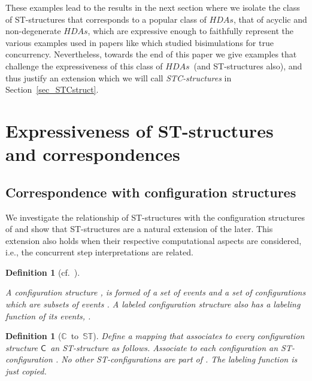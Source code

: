 \documentclass[submission,copyright,creativecommons]{eptcs}
\newtheorem{definition}[theorem]{Definition}
\newcommand\HDAs{\ensuremath{\mathit{HDAs}}}
\newcommand\C{\ensuremath{\mathsf{C}}}
\newcommand\allC{\ensuremath{\mathbb{C}}}
\newcommand\allST{\ensuremath{\mathbb{ST}}}
\begin{document}
These examples lead to the results in the next section where we isolate the class of ST-structures that corresponds to a popular class of \HDAs, that of acyclic and non-degenerate \HDAs, which are expressive enough to faithfully represent the various examples used in papers like \cite{GlabbeekV97splitting,GlabbeekG01refinement,BaldanC10concur,phillips11express} which studied bisimulations for true concurrency. Nevertheless, towards the end of this paper we give examples that challenge the expressiveness of this class of \HDAs\ (and ST-structures also), and thus justify an extension which we will call \textit{STC-structures} in Section~\ref{sec_STCstruct}. 



\section{Expressiveness of ST-structures and correspondences}\label{subsec_expressST}



\subsection{Correspondence with configuration structures}\label{subsec_configStruct}

We investigate the relationship of ST-structures with the configuration structures of \cite{GlabbeekP95config,GlabbeekP09configStruct} and show that ST-structures are a natural extension of the later. This extension also holds when their respective computational aspects are considered, i.e., the concurrent step interpretations are related.

\begin{definition}[{cf.~\cite[Def.5.1]{GlabbeekG01refinement}\cite[Def.1.1]{GlabbeekP09configStruct}}]\label{def_configurationStruct}\ 

A \textit{configuration structure} , is formed of a set  of \textit{events} and a set of configurations which are subsets of events . A \emph{labeled} configuration structure also has a labeling function of its events, .
\end{definition}


\begin{definition}[\allC\ to\ \allST]\label{def_confInST}
Define a mapping  that associates to every configuration structure \C\ an ST-structure  as follows.
Associate to each configuration  an ST-configuration . No other ST-configurations are part of . 
The labeling function is just copied.
\end{definition}
\end{document}
